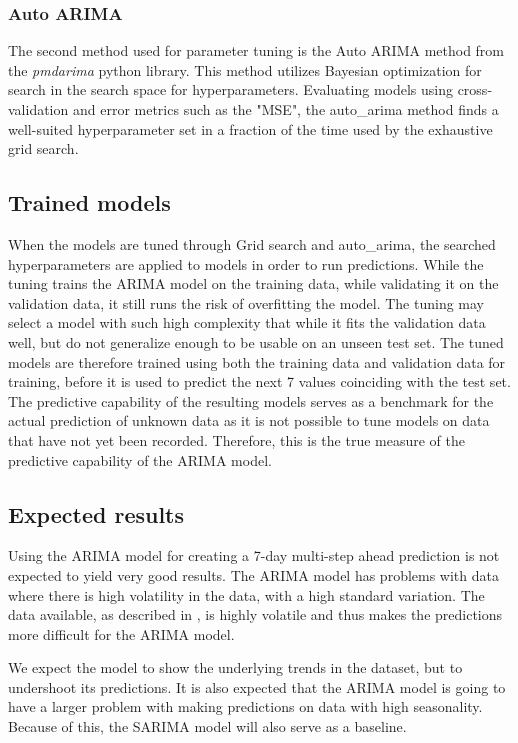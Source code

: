   \subsubsection{Auto ARIMA}
  The second method used for parameter tuning is the Auto ARIMA method from the \textit{pmdarima} python library.
  This method utilizes Bayesian optimization for search in the search space for hyperparameters.
  Evaluating models using cross-validation and error metrics such as the "MSE",
  the auto\_arima method finds a well-suited hyperparameter set in a fraction of the time used by the exhaustive grid search.

  \subsection{Trained models}
  When the models are tuned through Grid search and auto\_arima,
  the searched hyperparameters are applied to models in order to run predictions.
  While the tuning trains the ARIMA model on the training data, while validating it on the validation data,
  it still runs the risk of overfitting the model.
  The tuning may select a model with such high complexity that while it fits the validation data well,
  but do not generalize enough to be usable on an unseen test set.
  The tuned models are therefore trained using both the training data and validation data for training,
  before it is used to predict the next 7 values coinciding with the test set.
  The predictive capability of the resulting models serves as a benchmark for the actual prediction
  of unknown data as it is not possible to tune models on data that have not yet been recorded.
  Therefore, this is the true measure of the predictive capability of the ARIMA model.


  \subsection{Expected results}

  Using the ARIMA model for creating a 7-day multi-step ahead prediction is not expected to yield very good results.
  The ARIMA model has problems with data where there is high volatility in the data, with a high standard variation.
  The data available, as described in ,
  is highly volatile and thus makes the predictions more difficult for the ARIMA model.

  We expect the model to show the underlying trends in the dataset, but to
  undershoot its predictions.
  It is also expected that the ARIMA model is going to have a larger problem with making predictions on data with high seasonality.
  Because of this, the SARIMA model will also serve as a baseline.


